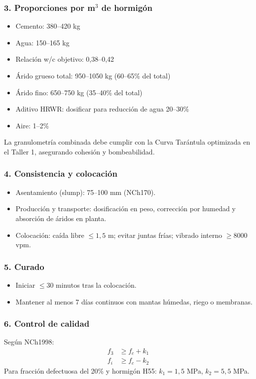 \subsubsection*{3. Proporciones por m$^3$ de hormigón}
\begin{itemize}
    \item Cemento: 380–420 kg
    \item Agua: 150–165 kg
    \item Relación w/c objetivo: 0,38–0,42
    \item Árido grueso total: 950–1050 kg (60–65\% del total)
    \item Árido fino: 650–750 kg (35–40\% del total)
    \item Aditivo HRWR: dosificar para reducción de agua 20–30\%
    \item Aire: 1–2\%
\end{itemize}
La granulometría combinada debe cumplir con la Curva Tarántula optimizada en el Taller 1, asegurando cohesión y bombeabilidad.

\subsubsection*{4. Consistencia y colocación}
\begin{itemize}
    \item Asentamiento (slump): 75–100 mm (NCh170).
    \item Producción y transporte: dosificación en peso, corrección por humedad y absorción de áridos en planta.
    \item Colocación: caída libre $\leq 1,5$ m; evitar juntas frías; vibrado interno $\geq 8000$ vpm.
\end{itemize}

\subsubsection*{5. Curado}
\begin{itemize}
    \item Iniciar $\leq 30$ minutos tras la colocación.
    \item Mantener al menos 7 días continuos con mantas húmedas, riego o membranas.
\end{itemize}

\subsubsection*{6. Control de calidad}
Según NCh1998:
\begin{align}
    f_3 &\geq f_c + k_1 \\
    f_i &\geq f_c - k_2
\end{align}
Para fracción defectuosa del 20\% y hormigón H55: $k_1 = 1,5$ MPa, $k_2 = 5,5$ MPa.  

